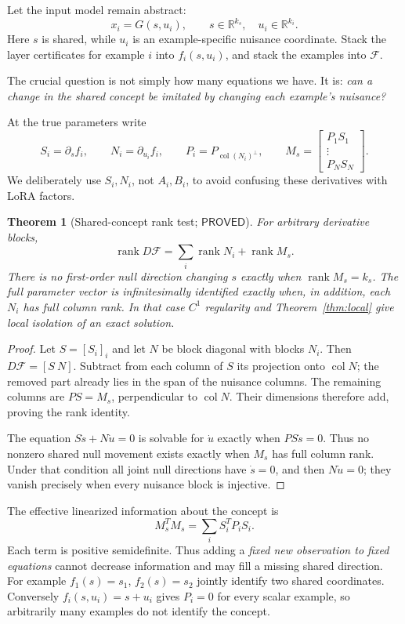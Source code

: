 \documentclass[12pt,a4paper]{article}
\theoremstyle{readable}
\newtheorem{theorem}{Theorem}[section]
\theoremstyle{definition}\newtheorem{example}[theorem]{Example}
\newcommand{\R}{\mathbb R}\newcommand{\rank}{\operatorname{rank}}
\newcommand{\col}{\operatorname{col}}\newcommand{\row}{\operatorname{row}}
\newcommand{\PP}{\mathsf{PROVED}}\newcommand{\FF}{\mathsf{FALSE}}
\begin{document}
Let the input model remain abstract:
\[
x_i=G(s,u_i),\qquad s\in\R^{k_s},\quad u_i\in\R^{k_i}.
\]
Here \(s\) is shared, while \(u_i\) is an example-specific nuisance coordinate. Stack the layer certificates for example \(i\) into \(f_i(s,u_i)\), and stack the examples into \(\mathcal F\).

The crucial question is not simply how many equations we have. It is: \emph{can a change in the shared concept be imitated by changing each example's nuisance?}

At the true parameters write
\[
S_i=\partial_sf_i,\qquad N_i=\partial_{u_i}f_i,\qquad
P_i=P_{\col(N_i)^\perp},\qquad
M_s=\begin{bmatrix}P_1S_1\\ \vdots\\ P_NS_N\end{bmatrix}.
\]
We deliberately use \(S_i,N_i\), not \(A_i,B_i\), to avoid confusing these derivatives with LoRA factors.

\begin{theorem}[Shared-concept rank test; \(\PP\)]\label{thm:sharedrank}
For arbitrary derivative blocks,
\[
\rank D\mathcal F=\sum_i\rank N_i+\rank M_s.
\]
There is no first-order null direction changing \(s\) exactly when \(\rank M_s=k_s\). The full parameter vector is infinitesimally identified exactly when, in addition, each \(N_i\) has full column rank. In that case \(C^1\) regularity and Theorem~\ref{thm:local} give local isolation of an exact solution.
\end{theorem}
\begin{proof}
Let \(S=[S_i]_i\) and let \(N\) be block diagonal with blocks \(N_i\). Then \(D\mathcal F=[S\ N]\). Subtract from each column of \(S\) its projection onto \(\col N\); the removed part already lies in the span of the nuisance columns. The remaining columns are \(PS=M_s\), perpendicular to \(\col N\). Their dimensions therefore add, proving the rank identity.

The equation \(S\dot s+N\dot u=0\) is solvable for \(\dot u\) exactly when \(PS\dot s=0\). Thus no nonzero shared null movement exists exactly when \(M_s\) has full column rank. Under that condition all joint null directions have \(\dot s=0\), and then \(N\dot u=0\); they vanish precisely when every nuisance block is injective.
\end{proof}

The effective linearized information about the concept is
\[
M_s^TM_s=\sum_i S_i^TP_iS_i.
\]
Each term is positive semidefinite. Thus adding a \emph{fixed new observation to fixed equations} cannot decrease information and may fill a missing shared direction. For example \(f_1(s)=s_1\), \(f_2(s)=s_2\) jointly identify two shared coordinates. Conversely \(f_i(s,u_i)=s+u_i\) gives \(P_i=0\) for every scalar example, so arbitrarily many examples do not identify the concept.
\end{document}
